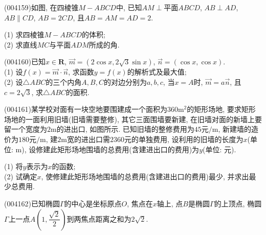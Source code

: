 \item (004159)如图, 在四棱锥$M-ABCD$中, 已知$AM\perp\text{平面}ABCD$, $AB\perp AD$, $AB\parallel CD$, $AB=2CD$, 且$AB=AM=AD=2$.
\begin{center}
\end{center}
(1) 求四棱锥$M-ABCD$的体积;\\
(2) 求直线$MC$与平面$ADM$所成的角.
\item (004160)已知$x\in \mathbf{R}$, $\overrightarrow m=(2\cos x,2\sqrt 3\sin x)$, $\overrightarrow n=(\cos x,\cos x)$.\\
(1) 设$f(x)=\overrightarrow m\cdot \overrightarrow n$, 求函数$y=f(x)$的解析式及最大值;\\
(2) 设$\triangle ABC$的三个内角$A,B,C$的对边分别为$a,b,c$, 当$x=A$时, $\overrightarrow m=a\overrightarrow n$, 且$c=2\sqrt 3$, 求$\triangle ABC$的面积.
\item (004161)某学校对面有一块空地要围建成一个面积为$360\text{m}^2$的矩形场地, 要求矩形场地的一面利用旧墙(旧墙需要整修), 其它三面围墙要新建, 在旧墙对面的新墙上要留一个宽度为$2\text{m}$的进出口, 如图所示. 已知旧墙的整修费用为$45\text{元/m}$, 新建墙的造价为$180\text{元/m}$, 建$2\text{m}$宽的进出口需$2360$元的单独费用, 设利用的旧墙的长度为$x$(单位: $\text{m}$), 设修建此矩形场地围墙的总费用(含建进出口的费用)为$y$(单位: 元).\\
\begin{center}
\end{center}
(1) 将$y$表示为$x$的函数;\\
(2) 试确定$x$, 使修建此矩形场地围墙的总费用(含建进出口的费用)最少, 并求出最少总费用.
\item (004162)已知椭圆$\Gamma$的中心是坐标原点$O$, 焦点在$x$轴上, 点$B$是椭圆$\Gamma$的上顶点, 椭圆$\Gamma$上一点$A(1,\dfrac{\sqrt2}{2})$到两焦点距离之和为$2\sqrt2$.
